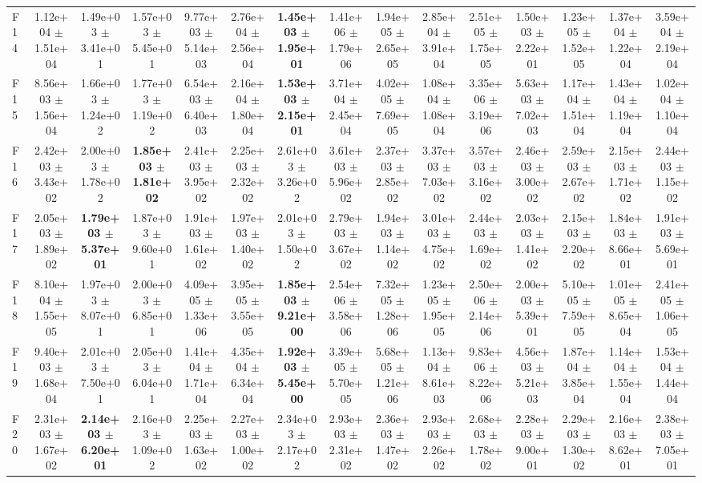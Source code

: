 \begin{table}
{\begin{tabular}{lcccccccccccccc}
F14 & 1.12e+04 $\pm$ 1.51e+04 & 1.49e+03 $\pm$ 3.41e+01 & 1.57e+03 $\pm$ 5.45e+01 & 9.77e+03 $\pm$ 5.14e+03 & 2.76e+04 $\pm$ 2.56e+04 & \textbf{1.45e+03 $\pm$ 1.95e+01} & 1.41e+06 $\pm$ 1.79e+06 & 1.94e+05 $\pm$ 2.65e+05 & 2.85e+04 $\pm$ 3.91e+04 & 2.51e+05 $\pm$ 1.75e+05 & 1.50e+03 $\pm$ 2.22e+01 & 1.23e+05 $\pm$ 1.52e+05 & 1.37e+04 $\pm$ 1.22e+04 & 3.59e+04 $\pm$ 2.19e+04 \\
F15 & 8.56e+03 $\pm$ 1.56e+04 & 1.66e+03 $\pm$ 1.24e+02 & 1.77e+03 $\pm$ 1.19e+02 & 6.54e+03 $\pm$ 6.40e+03 & 2.16e+04 $\pm$ 1.80e+04 & \textbf{1.53e+03 $\pm$ 2.15e+01} & 3.71e+04 $\pm$ 2.45e+04 & 4.02e+05 $\pm$ 7.69e+05 & 1.08e+04 $\pm$ 1.08e+04 & 3.35e+06 $\pm$ 3.19e+06 & 5.63e+03 $\pm$ 7.02e+03 & 1.17e+04 $\pm$ 1.51e+04 & 1.43e+04 $\pm$ 1.19e+04 & 1.02e+04 $\pm$ 1.10e+04 \\
F16 & 2.42e+03 $\pm$ 3.43e+02 & 2.00e+03 $\pm$ 1.78e+02 & \textbf{1.85e+03 $\pm$ 1.81e+02} & 2.41e+03 $\pm$ 3.95e+02 & 2.25e+03 $\pm$ 2.32e+02 & 2.61e+03 $\pm$ 3.26e+02 & 3.61e+03 $\pm$ 5.96e+02 & 2.37e+03 $\pm$ 2.85e+02 & 3.37e+03 $\pm$ 7.03e+02 & 3.57e+03 $\pm$ 3.16e+02 & 2.46e+03 $\pm$ 3.00e+02 & 2.59e+03 $\pm$ 2.67e+02 & 2.15e+03 $\pm$ 1.71e+02 & 2.44e+03 $\pm$ 1.15e+02 \\
F17 & 2.05e+03 $\pm$ 1.89e+02 & \textbf{1.79e+03 $\pm$ 5.37e+01} & 1.87e+03 $\pm$ 9.60e+01 & 1.91e+03 $\pm$ 1.61e+02 & 1.97e+03 $\pm$ 1.40e+02 & 2.01e+03 $\pm$ 1.50e+02 & 2.79e+03 $\pm$ 3.67e+02 & 1.94e+03 $\pm$ 1.14e+02 & 3.01e+03 $\pm$ 4.75e+02 & 2.44e+03 $\pm$ 1.69e+02 & 2.03e+03 $\pm$ 1.41e+02 & 2.15e+03 $\pm$ 2.20e+02 & 1.84e+03 $\pm$ 8.66e+01 & 1.91e+03 $\pm$ 5.69e+01 \\
F18 & 8.10e+04 $\pm$ 1.55e+05 & 1.97e+03 $\pm$ 8.07e+01 & 2.00e+03 $\pm$ 6.85e+01 & 4.09e+05 $\pm$ 1.33e+06 & 3.95e+05 $\pm$ 3.55e+05 & \textbf{1.85e+03 $\pm$ 9.21e+00} & 2.54e+06 $\pm$ 3.58e+06 & 7.32e+05 $\pm$ 1.28e+06 & 1.23e+05 $\pm$ 1.95e+05 & 2.50e+06 $\pm$ 2.14e+06 & 2.00e+03 $\pm$ 5.39e+01 & 5.10e+05 $\pm$ 7.59e+05 & 1.01e+05 $\pm$ 8.65e+04 & 2.41e+05 $\pm$ 1.06e+05 \\
F19 & 9.40e+03 $\pm$ 1.68e+04 & 2.01e+03 $\pm$ 7.50e+01 & 2.05e+03 $\pm$ 6.04e+01 & 1.41e+04 $\pm$ 1.71e+04 & 4.35e+04 $\pm$ 6.34e+04 & \textbf{1.92e+03 $\pm$ 5.45e+00} & 3.39e+05 $\pm$ 5.70e+05 & 5.68e+05 $\pm$ 1.21e+06 & 1.13e+04 $\pm$ 8.61e+03 & 9.83e+06 $\pm$ 8.22e+06 & 4.56e+03 $\pm$ 5.21e+03 & 1.87e+04 $\pm$ 3.85e+04 & 1.14e+04 $\pm$ 1.55e+04 & 1.53e+04 $\pm$ 1.44e+04 \\
F20 & 2.31e+03 $\pm$ 1.67e+02 & \textbf{2.14e+03 $\pm$ 6.20e+01} & 2.16e+03 $\pm$ 1.09e+02 & 2.25e+03 $\pm$ 1.63e+02 & 2.27e+03 $\pm$ 1.00e+02 & 2.34e+03 $\pm$ 2.17e+02 & 2.93e+03 $\pm$ 2.31e+02 & 2.36e+03 $\pm$ 1.47e+02 & 2.93e+03 $\pm$ 2.26e+02 & 2.68e+03 $\pm$ 1.78e+02 & 2.28e+03 $\pm$ 9.00e+01 & 2.29e+03 $\pm$ 1.30e+02 & 2.16e+03 $\pm$ 8.62e+01 & 2.38e+03 $\pm$ 7.05e+01 \\

\end{tabular}}
\end{table}
